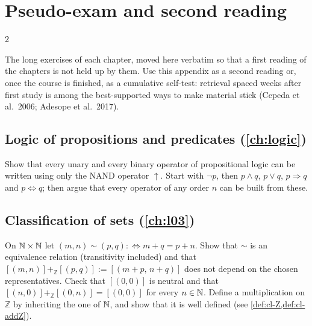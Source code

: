 \chapter{Pseudo-exam and second reading}\label{app:exam}
\begin{paracol}{2}

The long exercises of each chapter, moved here verbatim so that a first reading of the chapters is not held
up by them. Use this appendix as a second reading or, once the course is finished, as a cumulative
self-test: retrieval spaced weeks after first study is among the best-supported ways to make material stick
(Cepeda et al.\ 2006; Adesope et al.\ 2017).

\section{Logic of propositions and predicates (\cref{ch:logic})}\label{exam:ch01}

\begin{exercise}\label{ex:lo-nand-full}
Show that every unary and every binary operator of propositional logic can be written using only the
NAND operator $\uparrow$. Start with $\neg p$, then $p\wedge q$, $p\vee q$, $p\Rightarrow q$ and
$p\Leftrightarrow q$; then argue that every operator of any order $n$ can be built from these.
\end{exercise}

\section{Classification of sets (\cref{ch:l03})}\label{exam:ch03}

\begin{exercise}\label{ex:cl-wd-Z}
On $\mathbb{N}\times\mathbb{N}$ let $(m,n)\sim(p,q):\Leftrightarrow m+q=p+n$. Show that $\sim$ is an equivalence relation (transitivity
included) and that $[(m,n)]+_{\mathbb Z}[(p,q)]:=[(m+p,\,n+q)]$ does not depend on the chosen representatives. Check that
$[(0,0)]$ is neutral and that $[(n,0)]+_{\mathbb Z}[(0,n)]=[(0,0)]$ for every $n\in\mathbb{N}$. Define a multiplication on $\mathbb Z$ by
inheriting the one of $\mathbb{N}$, and show that it is well defined (see \cref{def:cl-Z,def:cl-addZ}).
\end{exercise}


\end{paracol}
